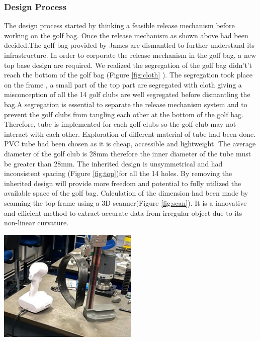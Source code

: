 \documentclass[11pt,landscape]{article}
\newenvironment{Figure}
  {\par\medskip\noindent\minipage{\linewidth}}
  {\endminipage\par\medskip}
\begin{document}
\begin{multicols}{3}
    \subsubsection{Design Process}
    The design process started by thinking a feasible release mechanism before
    working on the golf bag. Once the release mechanism as shown above had been
    decided.The golf bag provided by James are dismantled to further understand
    its infrastructure. In order to corporate the release mechanism in the golf
    bag, a new top base design are required. We realized the segregation of the
    golf bag didn't’t reach the bottom of the golf bag (Figure \ref{fig:cloth}
    ). The segregation took place on the frame , a small part of the top part
    are segregated with cloth giving a misconception of all the 14 golf clubs
    are well segregated before dismantling the bag.A segregation is essential to
    separate the release mechanism system and to prevent the golf clubs from
    tangling each other at the bottom of the golf bag. Therefore, tube is
    implemented for each golf clubs so the golf club may not interact with each
    other. Exploration of different material of tube had been done. PVC tube had
    been chosen as it is cheap, accessible and lightweight. The average diameter
    of the golf club is 28mm therefore the inner diameter of the tube must be
    greater than 28mm. The inherited design is unsymmetrical and had
    inconsistent spacing (Figure \ref{fig:top})for all the 14 holes. By removing
    the inherited design will provide more freedom and potential to fully
    utilized the available space of the golf bag. Calculation of the dimension
    had been made by scanning the top frame using a 3D scanner(Figure
    \ref{fig:scan}). It is a innovative and efficient method to extract accurate
    data from irregular object due to its non-linear curvature.
    \begin{Figure}
        \begin{center}
            \includegraphics[width=0.5\textwidth]{Figure15.jpg}
            \label{fig:scan}
        \end{center}
    \end{Figure}
    

\end{multicols}
\end{document}
